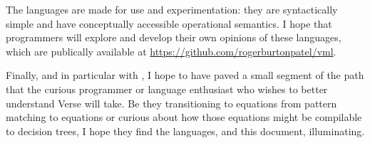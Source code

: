 \documentclass[manuscript,screen,review, 12pt, nonacm]{acmart}
\begin{document}
    The languages are made for use and experimentation: they are syntactically
    simple and have conceptually accessible operational semantics. I hope that
    programmers will explore and develop their own opinions of these languages,
    which are publically available at
    \url{https://github.com/rogerburtonpatel/vml}. 

    Finally, and in particular with \VMinus, I hope to have paved a small
    segment of the path that the curious programmer or language enthusiast who
    wishes to better understand Verse will take. Be they transitioning to
    equations from pattern matching to equations or curious about how those
    equations might be compilable to decision trees, I hope they find the
    languages, and this document, illuminating. 
    
\end{document}
